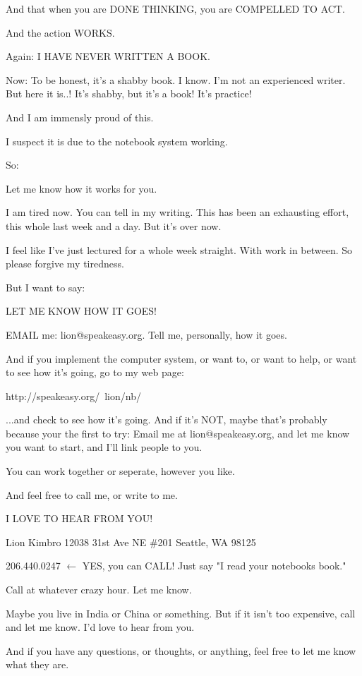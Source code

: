\documentclass[oneside]{scrbook}
\begin{document}
And that when you are DONE THINKING, you are COMPELLED TO ACT.

And the action WORKS.

Again: I HAVE NEVER WRITTEN A BOOK.

Now: To be honest, it's a shabby book. I know. I'm not an experienced
writer. But here it is..! It's shabby, but it's a book! It's practice!

And I am immensly proud of this.

I suspect it is due to the notebook system working.

So:

Let me know how it works for you.

I am tired now. You can tell in my writing. This has been an
exhausting effort, this whole last week and a day. But it's over now.

I feel like I've just lectured for a whole week straight. With work in
between. So please forgive my tiredness.

But I want to say:

LET ME KNOW HOW IT GOES!

EMAIL me: lion@speakeasy.org.
Tell me, personally, how it goes.

And if you implement the computer system, or want to, or want to help,
or want to see how it's going, go to my web page:

  http://speakeasy.org/~lion/nb/

...and check to see how it's going. And if it's NOT, maybe that's
probably because your the first to try: Email me at
lion@speakeasy.org, and let me know you want to start, and I'll link
people to you.

You can work together or seperate, however you like.

And feel free to call me, or write to me.

I LOVE TO HEAR FROM YOU!

  Lion Kimbro
  12038 31st Ave NE \#201
  Seattle, WA 98125

  206.440.0247  $\leftarrow$ YES, you can CALL! Just say "I read your notebooks
                   book."

Call at whatever crazy hour.
Let me know.

Maybe you live in India or China or something. But if it isn't too
expensive, call and let me know. I'd love to hear from you.

And if you have any questions, or thoughts, or anything, feel free to
let me know what they are.
\end{document}
